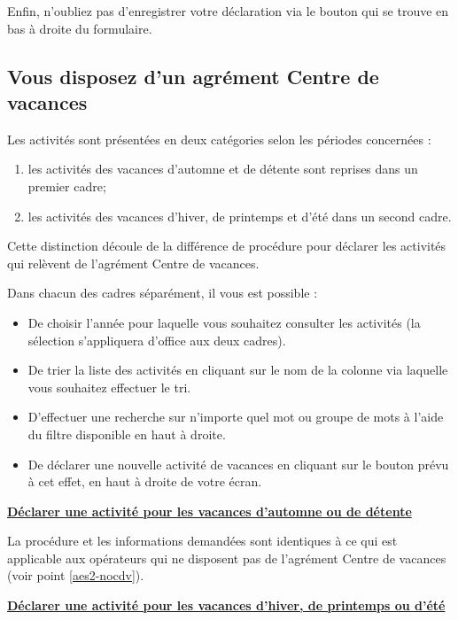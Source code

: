 Enfin, n’oubliez pas d’enregistrer votre déclaration via le bouton qui se trouve en bas à droite du formulaire.

\subsection{Vous disposez d’un agrément Centre de vacances}

Les activités sont présentées en deux catégories selon les périodes concernées : 
\begin{enumerate}
    \item les activités des vacances d’automne et de détente sont reprises dans un premier cadre;
    \item les activités des vacances d’hiver, de printemps et d’été dans un second cadre.
\end{enumerate}
 

\begin{information}
Cette distinction découle de la différence de procédure pour déclarer les activités qui relèvent de l’agrément Centre de vacances.
\end{information}

\begin{info}
Dans chacun des cadres séparément, il vous est possible :
\begin{itemize}
    \item De choisir l’année pour laquelle vous souhaitez consulter les activités (la sélection s’appliquera d’office aux deux cadres).
    \item De trier la liste des activités en cliquant sur le nom de la colonne via laquelle vous souhaitez effectuer le tri.
    \item D’effectuer une recherche sur n’importe quel mot ou groupe de mots à l’aide du filtre disponible en haut à droite.
    \item De déclarer une nouvelle activité de vacances en cliquant sur le bouton prévu à cet effet, en haut à droite de votre écran. 
\end{itemize}
\end{info}



\underline{\textbf{Déclarer une activité pour les vacances d’automne ou de détente}}

La procédure et les informations demandées sont identiques à ce qui est applicable aux opérateurs qui ne disposent pas de l’agrément Centre de vacances (voir point \ref{aes2-nocdv}).


\underline{\textbf{Déclarer une activité pour les vacances d’hiver, de printemps ou d’été}}

